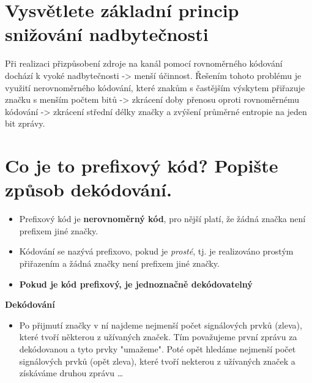 \section{ Vysvětlete základní princip snižování nadbytečnosti}
Při realizaci přizpůsobení zdroje na kanál pomocí rovnoměrného kódování dochází k vyoké nadbytečnosti -> menší účinnost.
Řešením tohoto problému je využití nerovnoměrného kódování, které znakům s častějším výskytem přiřazuje značku s menším počtem bitů -> zkrácení doby přenosu oproti rovnoměrnému kódování -> zkrácení střední délky značky a zvýšení průměrné entropie na jeden bit zprávy.

\section{Co je to prefixový kód? Popište způsob dekódování.}
\begin{itemize}
    \item Prefixový kód je \textbf{nerovnoměrný kód}, pro nější platí, že žádná značka není prefixem jiné značky.
    \item Kódování se nazývá prefixovo, pokud je \textit{prosté}, tj. je realizováno prostým přiřazením a žádná značky není prefixem jiné značky.
    \item \textbf{Pokud je kód prefixový, je jednoznačně dekódovatelný}

\end{itemize}
\textbf{Dekódování}
\begin{itemize}
    \item Po přijmutí značky v ní najdeme nejmenší počet signálových prvků (zleva), které tvoří některou z užívaných značek.
    Tím považujeme první zprávu za dekódovanou a tyto prvky "umažeme".
    Poté opět hledáme nejmenší počet signálových prvků (opět zleva), které tvoří nekterou z užívaných značek a získáváme druhou zprávu \dots
\end{itemize}

